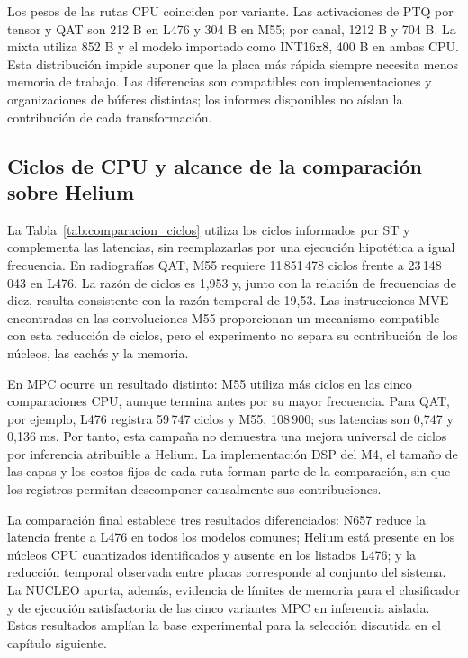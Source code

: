 Los pesos de las rutas CPU coinciden por variante. Las activaciones de PTQ por tensor y QAT son 212 B en L476 y 304 B en M55; por canal, 1212 B y 704 B. La mixta utiliza 852 B y el modelo importado como INT16x8, 400 B en ambas CPU. Esta distribución impide suponer que la placa más rápida siempre necesita menos memoria de trabajo. Las diferencias son compatibles con implementaciones y organizaciones de búferes distintas; los informes disponibles no aíslan la contribución de cada transformación.

\subsection{Ciclos de CPU y alcance de la comparación sobre Helium}

La Tabla~\ref{tab:comparacion_ciclos} utiliza los ciclos informados por ST y complementa las latencias, sin reemplazarlas por una ejecución hipotética a igual frecuencia. En radiografías QAT, M55 requiere 11\,851\,478 ciclos frente a 23\,148\,043 en L476. La razón de ciclos es 1,953 y, junto con la relación de frecuencias de diez, resulta consistente con la razón temporal de 19,53. Las instrucciones MVE encontradas en las convoluciones M55 proporcionan un mecanismo compatible con esta reducción de ciclos, pero el experimento no separa su contribución de los núcleos, las cachés y la memoria.

En MPC ocurre un resultado distinto: M55 utiliza más ciclos en las cinco comparaciones CPU, aunque termina antes por su mayor frecuencia. Para QAT, por ejemplo, L476 registra 59\,747 ciclos y M55, 108\,900; sus latencias son 0,747 y 0,136 ms. Por tanto, esta campaña no demuestra una mejora universal de ciclos por inferencia atribuible a Helium. La implementación DSP del M4, el tamaño de las capas y los costos fijos de cada ruta forman parte de la comparación, sin que los registros permitan descomponer causalmente sus contribuciones.

La comparación final establece tres resultados diferenciados: N657 reduce la latencia frente a L476 en todos los modelos comunes; Helium está presente en los núcleos CPU cuantizados identificados y ausente en los listados L476; y la reducción temporal observada entre placas corresponde al conjunto del sistema. La NUCLEO aporta, además, evidencia de límites de memoria para el clasificador y de ejecución satisfactoria de las cinco variantes MPC en inferencia aislada. Estos resultados amplían la base experimental para la selección discutida en el capítulo siguiente.
